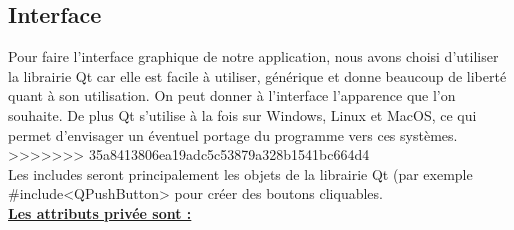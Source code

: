 \documentclass[a4paper,11pt]{article}
\begin{document}
		\subsection{Interface}
			Pour faire l'interface graphique de notre application, nous avons choisi d'utiliser la librairie Qt car elle est facile à utiliser, générique et donne beaucoup de liberté quant à son utilisation. 
			On peut donner à l’interface l’apparence que l’on souhaite. 
			De plus Qt s’utilise à la fois sur Windows, Linux et MacOS, ce qui permet d'envisager un éventuel portage du programme vers ces systèmes.\\
>>>>>>> 35a8413806ea19adc5c53879a328b1541bc664d4
			\\
			Les includes seront principalement les objets de la librairie Qt (par exemple \#include<QPushButton> pour créer des boutons cliquables.
			\\
			\underline{\bf Les attributs privée sont :}\\
\end{document}
